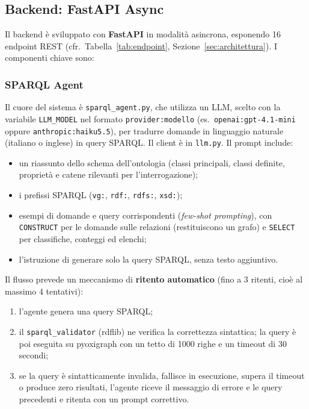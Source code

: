 \subsection{Backend: FastAPI Async}

Il backend \`e sviluppato con \textbf{FastAPI} \citep{fastapi} in modalit\`a
asincrona, esponendo 16 endpoint REST (cfr.~Tabella~\ref{tab:endpoint},
Sezione~\ref{sec:architettura}). I componenti chiave sono:

\subsubsection{SPARQL Agent}

\begingroup\sloppy
Il cuore del sistema \`e \texttt{sparql\_agent.py}, che utilizza un LLM, scelto con la variabile
\texttt{LLM\_MODEL} nel formato \texttt{provider:modello} (es.\ \texttt{openai:gpt-4.1-mini}
\citep{openai} oppure \texttt{anthropic:haiku5.5}), per tradurre domande in linguaggio naturale (italiano o
inglese) in query SPARQL. Il client \`e in \texttt{llm.py}. Il prompt include:\par\endgroup
\begin{itemize}[nosep]
  \item un riassunto dello schema dell'ontologia (classi principali, classi definite, propriet\`a e catene
    rilevanti per l'interrogazione);
  \item i prefissi SPARQL (\texttt{vg:}, \texttt{rdf:}, \texttt{rdfs:}, \texttt{xsd:});
  \item esempi di domande e query corrispondenti (\textit{few-shot prompting}), con \texttt{CONSTRUCT} per
    le domande sulle relazioni (restituiscono un grafo) e \texttt{SELECT} per classifiche, conteggi ed elenchi;
  \item l'istruzione di generare solo la query SPARQL, senza testo aggiuntivo.
\end{itemize}

Il flusso prevede un meccanismo di \textbf{ritento automatico} (fino a 3 ritenti, cio\`e al massimo 4
tentativi):
\begin{enumerate}[nosep]
  \item l'agente genera una query SPARQL;
  \item il \texttt{sparql\_validator} (rdflib) ne verifica la correttezza sintattica; la query \`e poi
    eseguita su pyoxigraph con un tetto di 1000 righe e un timeout di 30 secondi;
  \item se la query \`e sintatticamente invalida, fallisce in esecuzione, supera il timeout o produce zero
    risultati, l'agente riceve il messaggio di errore e le query precedenti e ritenta con un prompt
    correttivo.
\end{enumerate}

